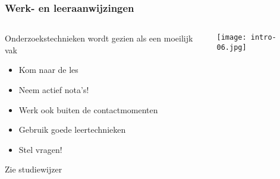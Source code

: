 \documentclass[aspectratio=169]{beamer}
\begin{document}
\begin{frame}
  \frametitle{Werk- en leeraanwijzingen}
  
  \begin{columns}
    \begin{column}{.8\textwidth}
        Onderzoekstechnieken wordt gezien als een moeilijk vak
      
      \begin{itemize}
        \item Kom naar de les
        \item Neem actief nota's!
        \item Werk ook buiten de contactmomenten
        \item Gebruik goede leertechnieken
        \item Stel vragen!
      \end{itemize}
      
      Zie studiewijzer
      
    \end{column}
  
    \begin{column}{.2\textwidth}
      \texttt{[image: intro-06.jpg]}
    \end{column}
  \end{columns}
  
\end{frame}

\end{document}
